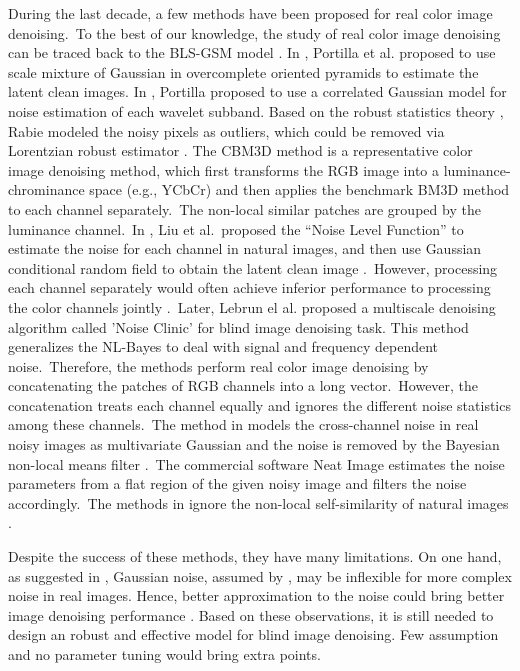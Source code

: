 During the last decade, a few methods have been proposed for real color image denoising.\ To the best of our knowledge, the study of real color image denoising can be traced back to the BLS-GSM model \cite{blsgsm}. In \cite{blsgsm}, Portilla et al. proposed to use scale mixture of Gaussian in overcomplete oriented pyramids to estimate the latent clean images. In \cite{fullyblind}, Portilla proposed to use a correlated Gaussian model for noise estimation of each wavelet subband. Based on the robust statistics theory \cite{huber2011robust}, Rabie modeled the noisy pixels as outliers, which could be removed via Lorentzian robust estimator \cite{rabie2005robust}. The CBM3D method \cite{cbm3d} is a representative color image denoising method, which first transforms the RGB image into a luminance-chrominance space (e.g., YCbCr) and then applies the benchmark BM3D method \cite{bm3d} to each channel separately.\ The non-local similar patches are grouped by the luminance channel.\ In \cite{Liu2008}, Liu et al.\ proposed the ``Noise Level Function'' to estimate the noise for each channel in natural images, and then use Gaussian conditional random field to obtain the latent clean image \cite{Liu2008}.\ However, processing each channel separately would often achieve inferior performance to processing the color channels jointly \cite{mairal2008sparse}.\ Later, Lebrun el al. proposed a multiscale denoising algorithm called 'Noise Clinic' \cite{noiseclinic} for blind image denoising task. This method generalizes the NL-Bayes \cite{nlbayes} to deal with signal and frequency dependent noise.\ Therefore, the methods \cite{noiseclinic,ncwebsite,Zhu_2016_CVPR} perform real color image denoising by concatenating the patches of RGB channels into a long vector.\ However, the concatenation treats each channel equally and ignores the different noise statistics among these channels.\ The method in \cite{crosschannel2016} models the cross-channel noise in real noisy images as multivariate Gaussian and the noise is removed by the Bayesian non-local means filter \cite{kervrann2007bayesian}.\ The commercial software Neat Image \cite{neatimage} estimates the noise parameters from a flat region of the given noisy image and filters the noise accordingly.\ The methods in \cite{crosschannel2016,neatimage} ignore the non-local self-similarity of natural images \cite{bm3d,wnnm}. 


Despite the success of these methods, they have many limitations. On one hand, as suggested in \cite{Liu2008,noiseclinic}, Gaussian noise, assumed by \cite{fullyblind,rabie2005robust,Liu2008}, may be inflexible for more complex noise in real images. Hence, better approximation to the noise could bring better image denoising performance \cite{Liu2008,noiseclinic}. Based on these observations, it is still needed to design an robust and effective model for blind image denoising. Few assumption and no parameter tuning would bring extra points.



